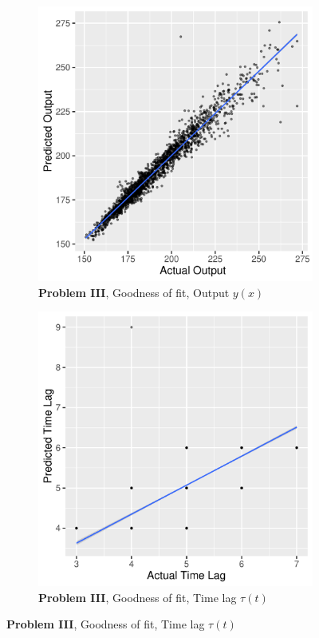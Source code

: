 \begin{figure}
  \centering

  \begin{subfigure}[b]{0.4\textwidth}
    \centering
    \includegraphics[width=\textwidth]{figures/exp3_scatter_v_test}
    \caption{ \textbf{Problem III}, Goodness of fit, Output $y(x)$}
    \label{fig:problem3_fitv}
  \end{subfigure}
  \hfill
  \begin{subfigure}[b]{0.4\textwidth}
    \centering
    \includegraphics[width=\textwidth]{figures/exp3_scatter_t_test}
    \caption{ \textbf{Problem III}, Goodness of fit, Time lag $\tau(t)$ }
    \label{fig:problem3_fitt}
  \end{subfigure}


\end{figure}
